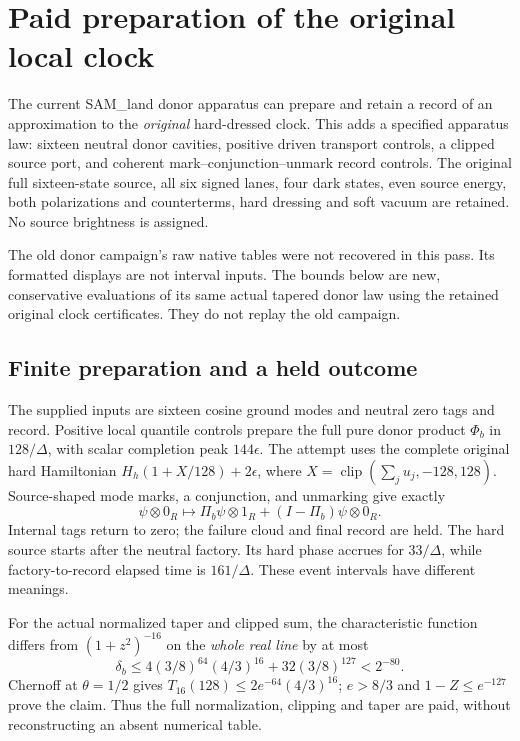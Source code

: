 \section{Paid preparation of the original local clock}
\label{sec:paid-original-preparation}
The current SAM\_land donor apparatus can prepare and retain a record of
an approximation to the \emph{original} hard-dressed clock. This adds a
specified apparatus law: sixteen neutral donor cavities, positive driven
transport controls, a clipped source port, and coherent
mark--conjunction--unmark record controls. The original full sixteen-state
source, all six signed lanes, four dark states, even source energy, both
polarizations and counterterms, hard dressing and soft vacuum are retained.
No source brightness is assigned.

The old donor campaign's raw native tables were not recovered in this pass.
Its formatted displays are not interval inputs. The bounds below are new,
conservative evaluations of its same actual tapered donor law using the
retained original clock certificates. They do not replay the old campaign.

\subsection{Finite preparation and a held outcome}
The supplied inputs are sixteen cosine ground modes and neutral zero tags
and record. Positive local quantile controls prepare the full pure donor
product $\Phi_b$ in $128/\Delta$, with scalar completion peak
$144\epsilon$. The attempt uses the complete original hard Hamiltonian
$H_h(1+X/128)+2\epsilon$, where
$X=\operatorname{clip}(\sum_j u_j,-128,128)$. Source-shaped mode marks,
a conjunction, and unmarking give exactly
\begin{equation}
 \psi\otimes0_R\longmapsto
 \Pi_b\psi\otimes1_R+(I-\Pi_b)\psi\otimes0_R.
\end{equation}
Internal tags return to zero; the failure cloud and final record are held.
The hard source starts after the neutral factory. Its hard phase accrues
for $33/\Delta$, while factory-to-record elapsed time is $161/\Delta$.
These event intervals have different meanings.

For the actual normalized taper and clipped sum, the characteristic
function differs from $(1+z^2)^{-16}$ on the \emph{whole real line} by at most
\begin{equation}
 \delta_b\leq4(3/8)^{64}(4/3)^{16}
              +32(3/8)^{127}<2^{-80}.
 \label{eq:prep-whole-filter}
\end{equation}
Chernoff at $\theta=1/2$ gives
$T_{16}(128)\leq2e^{-64}(4/3)^{16}$; $e>8/3$ and
$1-Z\leq e^{-127}$ prove the claim. Thus the full normalization, clipping
and taper are paid, without reconstructing an absent numerical table.

